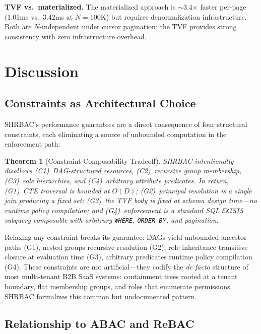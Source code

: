 \documentclass[conference]{IEEEtran}
\newtheorem{theorem}{Theorem}
\begin{document}
\textbf{TVF vs.\ materialized.} The materialized approach is ${\sim}$3.4$\times$ faster per-page (1.01ms vs.\ 3.42ms at $N{=}$100K) but requires denormalization infrastructure. Both are $N$-independent under cursor pagination; the TVF provides strong consistency with zero infrastructure overhead.

\section{Discussion}
\label{sec:discussion}

\subsection{Constraints as Architectural Choice}

SHRBAC's performance guarantees are a direct consequence of four structural constraints, each eliminating a source of unbounded computation in the enforcement path:

\begin{theorem}[Constraint-Composability Tradeoff]
SHRBAC intentionally disallows (C1)~DAG-structured resources, (C2)~recursive group membership, (C3)~role hierarchies, and (C4)~arbitrary attribute predicates. In return, (G1)~CTE traversal is bounded at $O(D)$; (G2)~principal resolution is a single join producing a fixed set; (G3)~the TVF body is fixed at schema design time---no runtime policy compilation; and (G4)~enforcement is a standard SQL \texttt{EXISTS} subquery composable with arbitrary \texttt{WHERE}, \texttt{ORDER BY}, and pagination.
\end{theorem}

Relaxing any constraint breaks its guarantee: DAGs yield unbounded ancestor paths (G1), nested groups recursive resolution (G2), role inheritance transitive closure at evaluation time (G3), arbitrary predicates runtime policy compilation (G4). These constraints are not artificial---they codify the \emph{de facto} structure of most multi-tenant B2B SaaS systems: containment trees rooted at a tenant boundary, flat membership groups, and roles that enumerate permissions. SHRBAC formalizes this common but undocumented pattern.

\subsection{Relationship to ABAC and ReBAC}
\end{document}
